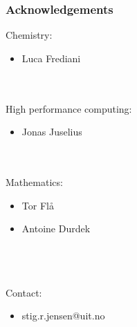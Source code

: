 \documentclass[mathserif]{beamer}
\begin{document}
\begin{frame}
    \frametitle{Acknowledgements}
    Chemistry:
    \begin{itemize}
	\item Luca Frediani
    \end{itemize}
    \ \\
    \ \\
    High performance computing:
    \begin{itemize}
    	\item Jonas Juselius
    \end{itemize}
    \ \\
    \ \\
    Mathematics:
    \begin{itemize}
	\item Tor Fl\aa
	\item Antoine Durdek
    \end{itemize}
    \ \\
    \ \\
    \ \\
    Contact:
    \begin{itemize}
	\item stig.r.jensen@uit.no
    \end{itemize}
\end{frame}
\end{document}
